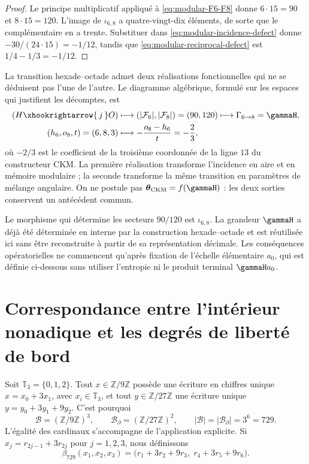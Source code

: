 \begin{proof}
Le principe multiplicatif appliqué à
\cref{eq:modular-F6-F8} donne \(6\cdot15=90\) et \(8\cdot15=120\).
L'image de \(\iota_{6,8}\) a quatre-vingt-dix éléments, de sorte que le
complémentaire en a trente. Substituer dans
\cref{eq:modular-incidence-defect} donne
\(-30/(24\cdot15)=-1/12\), tandis que
\cref{eq:modular-reciprocal-defect} est
\(1/4-1/3=-1/12\).
\end{proof}

La transition hexade--octade admet deux réalisations fonctionnelles qui ne
se déduisent pas l'une de l'autre. Le diagramme algébrique, formulé sur les espaces
qui justifient les décomptes, est
\begin{equation}
\label{eq:modular-68-two-readers}
\begin{aligned}
(H\xhookrightarrow{\,j\,}O)
&\longmapsto
\left(|\mathcal F_6|,|\mathcal F_8|\right)=(90,120)
\longmapsto\Gamma_{6\to8}=\gammaH,\\
(h_6,o_8,t)=(6,8,3)
&\longmapsto-\frac{o_8-h_6}{t}=-\frac23,
\end{aligned}
\end{equation}
où \(-2/3\) est le coefficient de la troisième coordonnée de la ligne
\(13\) du constructeur CKM. La première réalisation transforme
l'incidence en aire et en mémoire modulaire ; la seconde transforme la même
transition en paramètres de mélange angulaire.
On ne postule pas \(\boldsymbol\theta_{\rm CKM}=f(\gammaH)\) : les deux sorties
conservent un antécédent commun.

Le morphisme qui détermine les secteurs \(90/120\) est
\(\iota_{6,8}\). La grandeur \(\gammaH\) a déjà été déterminée en interne
par la construction hexade--octade et est réutilisée ici sans être reconstruite à
partir de sa représentation décimale. Les
conséquences opératorielles ne commencent qu'après fixation de l'échelle
élémentaire \(a_0\), qui est définie ci-dessous sans utiliser l'entropie ni le
produit terminal \(\gammaH a_0\).

\section{Correspondance entre l'intérieur nonadique et les degrés de liberté de bord}

Soit \(\mathbb T_3=\{0,1,2\}\). Tout \(x\in\mathbb Z/9\mathbb Z\) possède
une écriture en chiffres unique
\(x=x_0+3x_1\), avec \(x_i\in\mathbb T_3\), et tout
\(y\in\mathbb Z/27\mathbb Z\) une écriture unique
\(y=y_0+3y_1+9y_2\). C'est pourquoi
\begin{equation}
\label{eq:modular-bulk-boundary-729}
\mathcal B=(\mathbb Z/9\mathbb Z)^3,
\qquad
\mathcal B_\partial=(\mathbb Z/27\mathbb Z)^2,
\qquad
|\mathcal B|=|\mathcal B_\partial|=3^6=729.
\end{equation}
L'égalité des cardinaux s'accompagne de l'application explicite. Si
\(x_j=r_{2j-1}+3r_{2j}\) pour \(j=1,2,3\), nous définissons
\begin{equation}
\label{eq:modular-beta729}
\beta_{729}(x_1,x_2,x_3)
=\bigl(r_1+3r_2+9r_3,\;r_4+3r_5+9r_6\bigr).
\end{equation}

